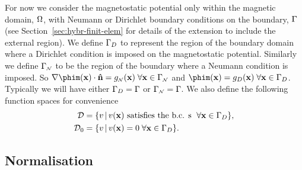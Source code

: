 For now we consider the magnetostatic potential only within the magnetic domain, $\Omega$, with Neumann or Dirichlet boundary conditions on the boundary, ${\Gamma}$ (see Section~\ref{sec:hybr-finit-elem} for details of the extension to include the external region). We define ${\Gamma}_D$ to represent the region of the boundary domain where a Dirichlet condition is imposed on the magnetostatic potential. Similarly we define ${\Gamma}_{\scriptscriptstyle{\mathcal{N}}}$ to be the region of the boundary where a Neumann condition is imposed. So $ \nabla \phim(\xv) \cdot \nv = g_\Neu(\xv) \; \forall \xv \in \boundd_\Neu$ and $\phim(\xv) = g_D(\xv) \; \forall \xv \in \boundd_D$. Typically we will have either ${\Gamma}_D = {\Gamma}$ or ${\Gamma}_{\scriptscriptstyle{\mathcal{N}}} = {\Gamma}$. We also define the following function spaces for convenience
\begin{align}
  \label{eq:037}
  \mathcal{D} & = \{ v \,|\, v(\mathbf{x}) \text{ satisfies the b.c. s } \; \forall \mathbf{x} \in {\Gamma}_D \}, \\
  \mathcal{D}_0 &= \{ v \,|\, v(\mathbf{x}) = 0 \; \forall \mathbf{x} \in {\Gamma}_D \}.
\end{align}

\subsection{Normalisation}
\label{sec:normalisation}



